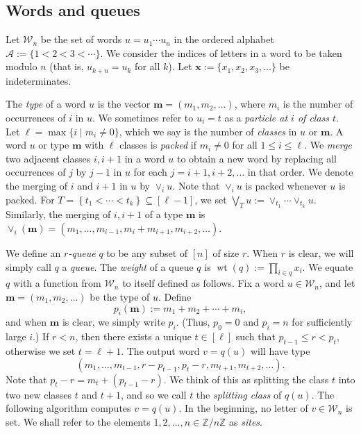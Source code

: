 \documentclass[reqno]{amsart}
\newcommand{\0}{\phantom{c}}
\newcommand{\merge}[1]{\vee_{#1}} %
\DeclareMathOperator{\wt}{wt} %
\newcommand{\xx}{\mathbf{x}}
\newcommand{\mm}{\mathbf{m}}
\newcommand{\mcA}{\mathcal{A}}
\newcommand{\mcW}{\mathcal{W}}
\newcommand{\ZZ}{\mathbb{Z}}
\let\prodnonlimits\prod
\renewcommand{\prod}{\prodnonlimits\limits}
\newcommand{\set}[1]{\left\{ #1 \right\}}
\newcommand{\ive}[1]{\left[ #1 \right]}
\newcommand{\defn}[1]{{\color{darkred}\emph{#1}}} %
\theoremstyle{plain}
\theoremstyle{definition}
\numberwithin{equation}{section}
\begin{document}
\subsection{Words and queues}

Let $\mcW_n$ be the set of words $u = u_1 \dotsm u_n$ in the ordered alphabet $\mcA := \{1 < 2 < 3 < \cdots \}$.
We consider the indices of letters in a word to be taken modulo $n$ (that is, $u_{k+n} = u_k$ for all $k$).
Let $\xx := \{x_1, x_2, x_3, \ldots\}$ be indeterminates.

The \defn{type} of a word $u$ is the vector $\mm = (m_1, m_2, \ldots)$, where $m_i$ is the number of occurrences of $i$ in $u$.
We sometimes refer to $u_i = t$ as a \defn{particle at $i$ of class $t$}.
Let $\ell = \max\{i \mid m_i \neq 0 \}$, which we say is the number of \defn{classes} in $u$ or $\mm$.
A word $u$ or type $\mm$ with $\ell$ classes is \defn{packed} if $m_i \neq 0$ for all $1 \leq i \leq \ell$.
We \defn{merge} two adjacent classes $i,i+1$ in a word $u$ to obtain a new word by replacing all occurrences of $j$ by $j-1$ in $u$ for each $j = i+1, i+2, \ldots$ in that order.
We denote the merging of $i$ and $i+1$ in $u$ by $\merge{i} u$.
Note that $\merge{i} u$ is packed whenever $u$ is packed.
For $T = \set{t_1 < \cdots < t_k} \subseteq \ive{\ell-1}$, we set $\bigvee_T u := \merge{t_1} \cdots \merge{t_k} u$.
Similarly, the merging of $i,i+1$ of a type $\mm$ is $\merge{i}(\mm) = (m_1, \dotsc, m_{i-1}, m_i + m_{i+1}, m_{i+2}, \ldots)$.

We define an \defn{$r$-queue} $q$ to be any subset of $\ive{n}$ of size $r$. When $r$ is clear, we will simply call $q$ a \defn{queue}.
The \defn{weight} of a queue $q$ is $\wt(q) := \prod_{i \in q} x_i$.
We equate $q$ with a function from $\mcW_n$ to itself defined as follows.
Fix a word $u \in \mcW_n$, and let $\mm = (m_1, m_2, \ldots)$ be the type of $u$.
Define
\begin{equation}
\label{eq:type_partial_sums}
p_i(\mm) := m_1 + m_2 + \cdots + m_i,
\end{equation}
and when $\mm$ is clear, we simply write $p_i$.
(Thus, $p_0 = 0$ and $p_i = n$ for sufficiently large $i$.)
If $r < n$, then there exists a unique $t \in \ive{\ell}$ such that
$
p_{t-1} \leq r < p_t,
$
otherwise we set $t = \ell + 1$.
The output word $v = q(u)$ will have type
\[
(m_1, \dots, m_{t-1}, r-p_{t-1}, p_{t}-r, m_{t+1}, m_{t+2}, \ldots).
\]
Note that $p_{t} - r = m_{t} + (p_{t-1} - r)$.
We think of this as splitting the class $t$ into two new classes $t$ and $t+1$, and so we call $t$ the \defn{splitting class} of $q(u)$.
The following algorithm computes $v = q(u)$.
In the beginning, no letter of $v \in \mcW_n$ is set.
We shall refer to the elements $1, 2, \ldots, n \in \ZZ / n \ZZ$ as \defn{sites}.
\end{document}
